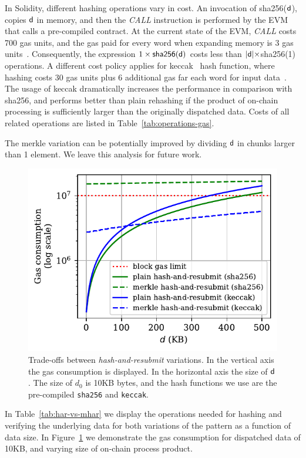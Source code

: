 In Solidity, different hashing operations vary in cost. An invocation of
\textsf{sha256}($\mathsf{d}$), copies $\mathsf{d}$ in memory, and then the
\emph{CALL} instruction is performed by the EVM that calls a pre-compiled
contract. At the current state of the EVM, \emph{CALL} costs 700 gas units, and
the gas paid for every word when expanding memory is 3 gas units~\cite{wood}.
Consequently, the expression $1 \times \textsf{sha256}(\mathsf{d})$ costs less than
$|\mathsf{d}| \times $\textsf{sha256}(1) operations. A different cost policy applies
for \textsf{keccak}~\cite{keccak} hash function, where hashing costs 30 gas
units plus 6 additional gas far each word for input data~\cite{wood}. The usage
of \textsf{keccak} dramatically increases the performance in comparison with
\textsf{sha256}, and performs better than plain rehashing if the product of
on-chain processing is sufficiently larger than the originally dispatched data.
Costs of all related operations are listed in Table~\ref{tab:operations-gas}.

The merkle variation can be potentially improved by dividing $\mathsf{d}$ in
chunks larger than 1 element. We leave this analysis for future work.

\begin{figure}[H]
    \vspace*{-5mm}
    \begin{center}
        \includegraphics[width=0.9\columnwidth]{figures/har-vs-mhar.pdf}
    \end{center}
    \vspace*{-7mm}
    \caption{Trade-offs between \emph{hash-and-resubmit} variations. In the
    vertical axis the gas consumption is displayed. In the horizontal axis the
    size of $\mathsf{d}$. The size of $d_0$ is 10KB bytes, and the hash functions we
    use are the pre-compiled \texttt{sha256} and \texttt{keccak}.}
    \label{fig:har-vs-mhar}
    \vspace*{-4mm}
\end{figure}

In Table~\ref{tab:har-vs-mhar} we display the operations needed for hashing and
verifying the underlying data for both variations of the pattern as a function
of data size. In Figure~\ref{fig:har-vs-mhar} we demonstrate the gas
consumption for dispatched data of 10KB, and varying size of on-chain
process product.




